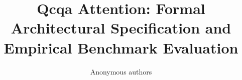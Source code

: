 \title{\textbf{Qcqa Attention: Formal Architectural Specification and Empirical Benchmark Evaluation}}

\author{Anonymous authors}
